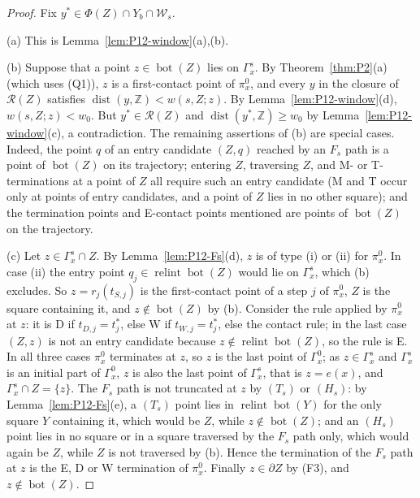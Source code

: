 \documentclass[11pt]{amsart}
\newcommand{\Z}{\mathbb Z}
\newcommand{\cR}{\mathcal R}
\newcommand{\relint}{\operatorname{relint}}
\newcommand{\Bot}{\operatorname{bot}}
\newcommand{\dist}{\operatorname{dist}}
\newcommand{\Fs}{F_{s}}
\theoremstyle{definition}
\theoremstyle{remark}
\numberwithin{equation}{section}
\begin{document}
\begin{proof}
Fix $y^*\in\Phi(Z)\cap Y_b\cap\mathcal W_s$.

(a) This is Lemma~\ref{lem:P12-window}(a),(b).

(b) Suppose that a point $z\in\Bot(Z)$ lies on $\Gamma^s_x$. By Theorem~\ref{thm:P2}(a) (which uses (Q1)), $z$ is a first-contact point of $\pi^0_x$, and every $y$ in the closure of $\cR(Z)$ satisfies $\dist(y,\Z)<w(s,Z;z)$. By Lemma~\ref{lem:P12-window}(d), $w(s,Z;z)<w_0$. But $y^*\in\cR(Z)$ and $\dist(y^*,\Z)\ge w_0$ by Lemma~\ref{lem:P12-window}(c), a contradiction. The remaining assertions of (b) are special cases. Indeed, the point $q$ of an entry candidate $(Z,q)$ reached by an $\Fs$ path is a point of $\Bot(Z)$ on its trajectory; entering $Z$, traversing $Z$, and M- or T-terminations at a point of $Z$ all require such an entry candidate (M and T occur only at points of entry candidates, and a point of $Z$ lies in no other square); and the termination points and E-contact points mentioned are points of $\Bot(Z)$ on the trajectory.

(c) Let $z\in\Gamma^s_x\cap Z$. By Lemma~\ref{lem:P12-Fs}(d), $z$ is of type (i) or (ii) for $\pi^0_x$. In case (ii) the entry point $q_j\in\relint\Bot(Z)$ would lie on $\Gamma^s_x$, which (b) excludes. So $z=r_j(t_{S,j})$ is the first-contact point of a step $j$ of $\pi^0_x$, $Z$ is the square containing it, and $z\notin\Bot(Z)$ by (b). Consider the rule applied by $\pi^0_x$ at $z$: it is D if $t_{D,j}=t^*_j$, else W if $t_{W,j}=t^*_j$, else the contact rule; in the last case $(Z,z)$ is not an entry candidate because $z\notin\relint\Bot(Z)$, so the rule is E. In all three cases $\pi^0_x$ terminates at $z$, so $z$ is the last point of $\Gamma^0_x$; as $z\in\Gamma^s_x$ and $\Gamma^s_x$ is an initial part of $\Gamma^0_x$, $z$ is also the last point of $\Gamma^s_x$, that is $z=e(x)$, and $\Gamma^s_x\cap Z=\{z\}$. The $\Fs$ path is not truncated at $z$ by $(T_s)$ or $(H_s)$: by Lemma~\ref{lem:P12-Fs}(e), a $(T_s)$ point lies in $\relint\Bot(Y)$ for the only square $Y$ containing it, which would be $Z$, while $z\notin\Bot(Z)$; and an $(H_s)$ point lies in no square or in a square traversed by the $\Fs$ path only, which would again be $Z$, while $Z$ is not traversed by (b). Hence the termination of the $\Fs$ path at $z$ is the E, D or W termination of $\pi^0_x$. Finally $z\in\partial Z$ by (F3), and $z\notin\Bot(Z)$.


\end{proof}
\end{document}

